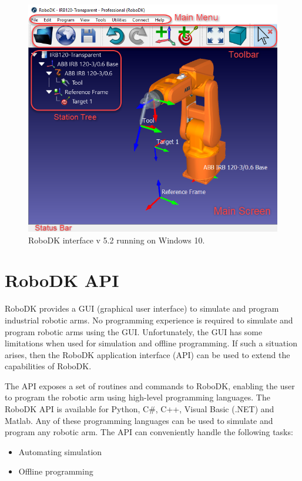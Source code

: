 \begin{figure}[h]
    \centering
    \includegraphics[width=0.9\linewidth]{img/robodk_interface.png}
    \caption{RoboDK interface v 5.2 running on Windows 10.}
    \label{fig:robodkinterface}
\end{figure}

\section{RoboDK API}

RoboDK provides a GUI (graphical user interface) to simulate and program industrial robotic arms. No programming experience is required to simulate and program robotic arms using the GUI. Unfortunately, the GUI has some limitations when used for simulation and offline programming. If such a situation arises, then the RoboDK application interface (API) can be used to extend the capabilities of RoboDK.

The API exposes a set of routines and commands to RoboDK, enabling the user to program the robotic arm using high-level programming languages. The RoboDK API is available for Python, C\#, C++, Visual Basic (.NET) and Matlab. Any of these programming languages can be used to simulate and program any robotic arm. The API can conveniently handle the following tasks:

\begin{itemize}
    \item Automating simulation
    \item Offline programming
\end{itemize}

